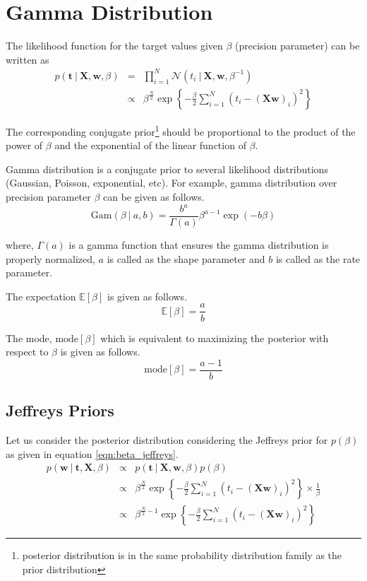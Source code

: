\documentclass[11pt]{article}
\newcommand{\mean}[1]{\mathbb{E}\left[#1\right]}
\newcommand\given[1][]{\:#1\vert\:}
\begin{document}
\section{Gamma Distribution}

The likelihood function for the target values given $\beta$ (precision parameter) can be written as 
\begin{eqnarray}
    p(\bm{t} \given \bm{X}, \bm{w}, \beta) &=& \prod_{i=1}^N \mathcal{N}(t_i \given \bm{X}, \bm{w}, \beta^{-1}) \\
    &\propto& \beta^{\frac{N}{2}}\exp\left\{-\frac{\beta}{2} \sum_{i=1}^N(t_i - (\bm{X}\bm{w})_i)^2 \right\}
\end{eqnarray}

The corresponding conjugate prior\footnote{posterior distribution is in the same probability distribution family as the prior distribution} should be proportional to the product of the power of $\beta$ and the exponential of the linear function of $\beta$. 

Gamma distribution is a conjugate prior to several likelihood distributions (Gaussian, Poisson, exponential, etc). For example, gamma distribution over precision parameter $\beta$ can be given as follows.
\begin{equation} \label{gamma_dist}
    \text{Gam}\left(\beta \given a, b\right) = \frac{b^a}{\Gamma(a)}\beta^{a-1}\exp{(-b\beta)}
\end{equation}

where, $\Gamma(a)$ is a gamma function that ensures the gamma distribution is properly normalized, $a$ is called as the shape parameter and $b$ is called as the rate parameter.  

The expectation $\mean{\beta}$ is given as follows.
\begin{equation}
    \mean{\beta} = \frac{a}{b}
\end{equation}

The mode, $\text{mode}\left[\beta\right]$ which is equivalent to maximizing the posterior with respect to $\beta$ is given as follows.
\begin{equation} \label{mode}
    \text{mode}\left[\beta\right] = \frac{a-1}{b}
\end{equation}

\subsection{Jeffreys Priors}
Let us consider the posterior distribution considering the Jeffreys prior for $p(\beta)$ as given in equation \ref{eqn:beta_jeffreys}.
\begin{eqnarray}
    p(\bm{w} \given \bm{t}, \bm{X}, \beta) 
    &\propto& p(\bm{t} \given \bm{X}, \bm{w}, \beta) p(\beta) \\
    &\propto& \beta^{\frac{N}{2}}\exp\left\{-\frac{\beta}{2} \sum_{i=1}^N(t_i - (\bm{X}\bm{w})_i)^2 \right\} \times \frac{1}{\beta} \\
    &\propto& \beta^{\frac{N}{2}-1}\exp\left\{-\frac{\beta}{2} \sum_{i=1}^N(t_i - (\bm{X}\bm{w})_i)^2 \right\}
\end{eqnarray}
\end{document}
